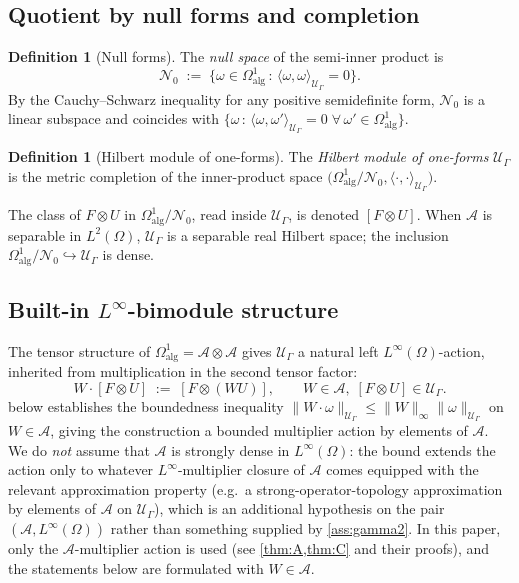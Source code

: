 \documentclass[11pt,reqno]{amsart}
\theoremstyle{plain}
\theoremstyle{definition}
\newtheorem{definition}[theorem]{Definition}
\theoremstyle{remark}
\newcommand{\cA}{\mathcal A}
\newcommand{\cU}{\mathcal U}
\begin{document}
\subsection{Quotient by null forms and completion}\label{sec:moduleA-quot}

\begin{definition}[Null forms]\label{def:null-forms}
The \emph{null space} of the semi-inner product is
\[
  \mathcal N_{0}\;:=\;\{\omega\in\Omega^{1}_{\mathrm{alg}}\,:\,
    \langle\omega,\omega\rangle_{\cU_{\Gamma}}=0\}.
\]
By the Cauchy--Schwarz inequality for any positive semidefinite
form, $\mathcal N_{0}$ is a linear subspace and coincides with
$\{\omega\,:\,\langle\omega,\omega'\rangle_{\cU_{\Gamma}}=0
\;\forall\,\omega'\in\Omega^{1}_{\mathrm{alg}}\}$.
\end{definition}

\begin{definition}[Hilbert module of one-forms]\label{def:energy-module}
The \emph{Hilbert module of one-forms} $\cU_{\Gamma}$ is the
metric completion of the inner-product space
$\bigl(\Omega^{1}_{\mathrm{alg}}/\mathcal N_{0},
\langle\cdot,\cdot\rangle_{\cU_{\Gamma}}\bigr)$.
\end{definition}

The class of $F\otimes U$ in $\Omega^{1}_{\mathrm{alg}}/\mathcal N_{0}$,
read inside $\cU_{\Gamma}$, is denoted $[F\otimes U]$. When
$\cA$ is separable in $L^{2}(\Omega)$, $\cU_{\Gamma}$ is a
separable real Hilbert space; the inclusion
$\Omega^{1}_{\mathrm{alg}}/\mathcal N_{0}\hookrightarrow\cU_{\Gamma}$
is dense.

\subsection{Built-in \texorpdfstring{$L^{\infty}$}{L-infinity}-bimodule structure}\label{sec:moduleA-bimodule}

The tensor structure of $\Omega^{1}_{\mathrm{alg}}=\cA\otimes\cA$
gives $\cU_{\Gamma}$ a natural left $L^{\infty}(\Omega)$-action,
inherited from multiplication in the second tensor factor:
\begin{equation}\label{eq:bimodule-action-def}
  W\cdot[F\otimes U]\;:=\;[F\otimes(WU)],
  \qquad W\in\cA,\;[F\otimes U]\in\cU_{\Gamma}.
\end{equation}
 below establishes the boundedness
inequality $\|W\cdot\omega\|_{\cU_{\Gamma}}\le\|W\|_{\infty}\|\omega\|_{\cU_{\Gamma}}$
on $W\in\cA$, giving the construction a bounded multiplier
action by elements of $\cA$. We do \emph{not} assume that
$\cA$ is strongly dense in $L^{\infty}(\Omega)$: the bound
extends the action only to whatever $L^{\infty}$-multiplier
closure of $\cA$ comes equipped with the relevant approximation
property (e.g.\ a strong-operator-topology approximation by
elements of $\cA$ on $\cU_{\Gamma}$), which is an additional
hypothesis on the pair $(\cA,L^{\infty}(\Omega))$ rather than
something supplied by \cref{ass:gamma2}. In this paper, only the
$\cA$-multiplier action is used (see \cref{thm:A,thm:C} and
their proofs), and the statements below are formulated with
$W\in\cA$.
\end{document}
